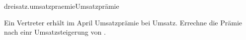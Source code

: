 \begin{exercise}{dreisatz.umsatzpraemie}{Umsatzprämie}
  \ifproblem\problem\par
    Ein Vertreter erhält im April  Umsatzprämie bei 
    Umsatz. Errechne die Prämie nach einr Umsatzsteigerung von .
  \fi
\end{exercise}
